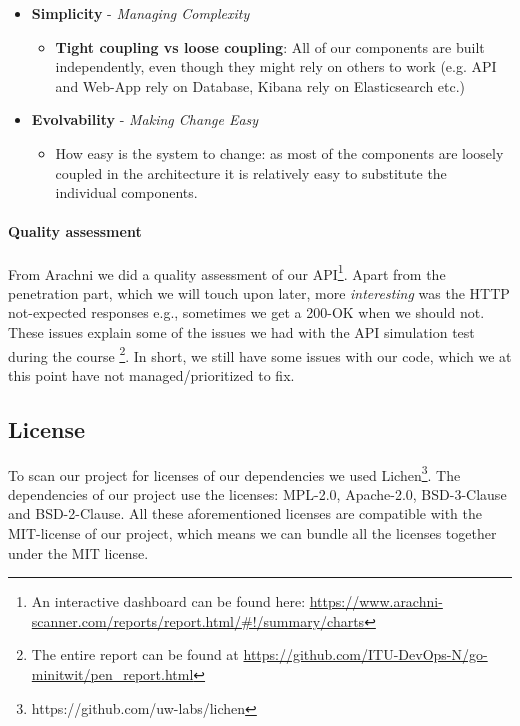 \begin{itemize}
\begin{itemize}
    \end{itemize}
    \item \textbf{Simplicity} - \textit{Managing Complexity}
    \begin{itemize}
        \item \textbf{Tight coupling vs loose coupling}: All of our components are built independently, even though they might rely on others to work (e.g. API and Web-App rely on Database, Kibana rely on Elasticsearch etc.)
    \end{itemize}
    \item \textbf{Evolvability} - \textit{Making Change Easy} 
    \begin{itemize}
        \item How easy is the system to change: as most of the components are loosely coupled in the architecture it is relatively easy to substitute the individual components.  
    \end{itemize}
    
\end{itemize}

\paragraph{Quality assessment}
From Arachni we did a quality assessment of our API\footnote{An interactive dashboard can be found here: \url{https://www.arachni-scanner.com/reports/report.html/\#!/summary/charts}}. Apart from the penetration part, which we will touch upon later, more \textit{interesting} was the HTTP not-expected responses e.g., sometimes we get a 200-OK when we should not. These issues explain some of the issues we had with the API simulation test during the course \footnote{The entire report can be found at \url{https://github.com/ITU-DevOps-N/go-minitwit/pen_report.html}}. 
In short, we still have some issues with our code, which we at this point have not managed/prioritized to fix.



\subsection{License}
To scan our project for licenses of our dependencies we used Lichen\footnote{https://github.com/uw-labs/lichen}. The dependencies of our project use the licenses: MPL-2.0, Apache-2.0, BSD-3-Clause and BSD-2-Clause. All these aforementioned licenses are compatible with the MIT-license of our project, which means we can bundle all the licenses together under the MIT license. 
